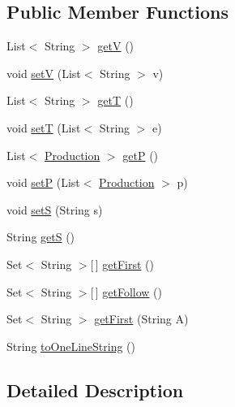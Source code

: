 \subsection*{Public Member Functions}
\begin{DoxyCompactItemize}
\item 
List$<$ String $>$ \hyperlink{interfacecontext_free_1_1grammar_1_1_i_grammar_a4b1bc2134e63051dc37e693294aaeec6}{get\-V} ()
\item 
void \hyperlink{interfacecontext_free_1_1grammar_1_1_i_grammar_ae7bd17123ad7424af06a7da75a6bc745}{set\-V} (List$<$ String $>$ v)
\item 
List$<$ String $>$ \hyperlink{interfacecontext_free_1_1grammar_1_1_i_grammar_a996f5e0bed5a6ac469b764f56d420fb1}{get\-T} ()
\item 
void \hyperlink{interfacecontext_free_1_1grammar_1_1_i_grammar_a775125de1388036059da1860ae61a100}{set\-T} (List$<$ String $>$ e)
\item 
List$<$ \hyperlink{classcontext_free_1_1grammar_1_1_production}{Production} $>$ \hyperlink{interfacecontext_free_1_1grammar_1_1_i_grammar_a629ab4dc36a869b93fa239a3fee760f9}{get\-P} ()
\item 
void \hyperlink{interfacecontext_free_1_1grammar_1_1_i_grammar_ac070229e5571e47032b5199c0bf2c354}{set\-P} (List$<$ \hyperlink{classcontext_free_1_1grammar_1_1_production}{Production} $>$ p)
\item 
void \hyperlink{interfacecontext_free_1_1grammar_1_1_i_grammar_a134f8b2183ec804eff78ac57b16a0ab9}{set\-S} (String s)
\item 
String \hyperlink{interfacecontext_free_1_1grammar_1_1_i_grammar_aceb36e584d26bd39a0f5186742cc9b5b}{get\-S} ()
\item 
Set$<$ String $>$\mbox{[}$\,$\mbox{]} \hyperlink{interfacecontext_free_1_1grammar_1_1_i_grammar_a256e9280e008a7c709ccb80725ccc0f2}{get\-First} ()
\item 
Set$<$ String $>$\mbox{[}$\,$\mbox{]} \hyperlink{interfacecontext_free_1_1grammar_1_1_i_grammar_aad085d9f84a32ca1abe5fba0c9e5f20c}{get\-Follow} ()
\item 
Set$<$ String $>$ \hyperlink{interfacecontext_free_1_1grammar_1_1_i_grammar_a7a05f11e88cdbe29db1849541592e272}{get\-First} (String A)
\item 
String \hyperlink{interfacecontext_free_1_1grammar_1_1_i_grammar_a5fdeb5a6a9426b400c2fe805566a377c}{to\-One\-Line\-String} ()
\end{DoxyCompactItemize}


\subsection{Detailed Description}


